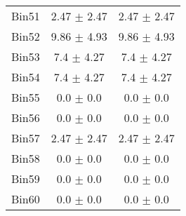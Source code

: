 \begin{tabular}{|c|c|c|}
     Bin51 & 2.47 $\pm$ 2.47 & 2.47 $\pm$ 2.47 \\ \cline{1-3} 
     Bin52 & 9.86 $\pm$ 4.93 & 9.86 $\pm$ 4.93 \\ \cline{1-3} 
     Bin53 & 7.4 $\pm$ 4.27 & 7.4 $\pm$ 4.27 \\ \cline{1-3} 
     Bin54 & 7.4 $\pm$ 4.27 & 7.4 $\pm$ 4.27 \\ \cline{1-3} 
     Bin55 & 0.0 $\pm$ 0.0 & 0.0 $\pm$ 0.0 \\ \cline{1-3} 
     Bin56 & 0.0 $\pm$ 0.0 & 0.0 $\pm$ 0.0 \\ \cline{1-3} 
     Bin57 & 2.47 $\pm$ 2.47 & 2.47 $\pm$ 2.47 \\ \cline{1-3} 
     Bin58 & 0.0 $\pm$ 0.0 & 0.0 $\pm$ 0.0 \\ \cline{1-3} 
     Bin59 & 0.0 $\pm$ 0.0 & 0.0 $\pm$ 0.0 \\ \cline{1-3} 
     Bin60 & 0.0 $\pm$ 0.0 & 0.0 $\pm$ 0.0 \\ \cline{1-3} 
  \end{tabular}
